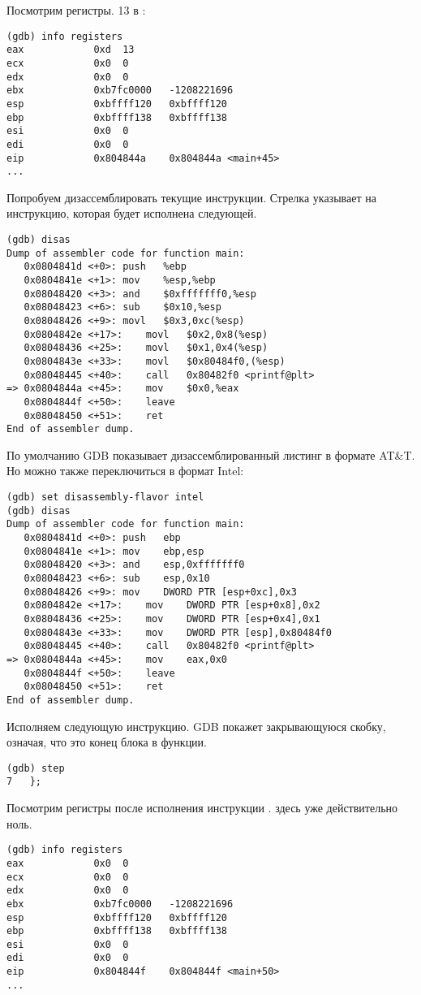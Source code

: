 Посмотрим регистры.
13 в \EAX:

\begin{lstlisting}
(gdb) info registers
eax            0xd	13
ecx            0x0	0
edx            0x0	0
ebx            0xb7fc0000	-1208221696
esp            0xbffff120	0xbffff120
ebp            0xbffff138	0xbffff138
esi            0x0	0
edi            0x0	0
eip            0x804844a	0x804844a <main+45>
...
\end{lstlisting}

Попробуем дизассемблировать текущие инструкции.
Стрелка указывает на инструкцию, которая будет исполнена следующей.

\begin{lstlisting}[style=customasm]
(gdb) disas
Dump of assembler code for function main:
   0x0804841d <+0>:	push   %ebp
   0x0804841e <+1>:	mov    %esp,%ebp
   0x08048420 <+3>:	and    $0xfffffff0,%esp
   0x08048423 <+6>:	sub    $0x10,%esp
   0x08048426 <+9>:	movl   $0x3,0xc(%esp)
   0x0804842e <+17>:	movl   $0x2,0x8(%esp)
   0x08048436 <+25>:	movl   $0x1,0x4(%esp)
   0x0804843e <+33>:	movl   $0x80484f0,(%esp)
   0x08048445 <+40>:	call   0x80482f0 <printf@plt>
=> 0x0804844a <+45>:	mov    $0x0,%eax
   0x0804844f <+50>:	leave  
   0x08048450 <+51>:	ret    
End of assembler dump.
\end{lstlisting}

По умолчанию \ac{GDB} показывает дизассемблированный листинг в формате AT\&T.
Но можно также переключиться в формат Intel:

\begin{lstlisting}[style=customasm]
(gdb) set disassembly-flavor intel
(gdb) disas
Dump of assembler code for function main:
   0x0804841d <+0>:	push   ebp
   0x0804841e <+1>:	mov    ebp,esp
   0x08048420 <+3>:	and    esp,0xfffffff0
   0x08048423 <+6>:	sub    esp,0x10
   0x08048426 <+9>:	mov    DWORD PTR [esp+0xc],0x3
   0x0804842e <+17>:	mov    DWORD PTR [esp+0x8],0x2
   0x08048436 <+25>:	mov    DWORD PTR [esp+0x4],0x1
   0x0804843e <+33>:	mov    DWORD PTR [esp],0x80484f0
   0x08048445 <+40>:	call   0x80482f0 <printf@plt>
=> 0x0804844a <+45>:	mov    eax,0x0
   0x0804844f <+50>:	leave  
   0x08048450 <+51>:	ret    
End of assembler dump.
\end{lstlisting}

Исполняем следующую инструкцию.
\ac{GDB} покажет закрывающуюся скобку, означая, что это конец блока в функции.

\begin{lstlisting}
(gdb) step
7	};
\end{lstlisting}

Посмотрим регистры после исполнения инструкции .
\EAX здесь уже действительно ноль.

\begin{lstlisting}
(gdb) info registers
eax            0x0	0
ecx            0x0	0
edx            0x0	0
ebx            0xb7fc0000	-1208221696
esp            0xbffff120	0xbffff120
ebp            0xbffff138	0xbffff138
esi            0x0	0
edi            0x0	0
eip            0x804844f	0x804844f <main+50>
...
\end{lstlisting}
